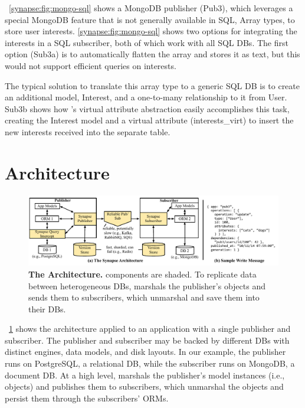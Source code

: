 \F~\ref{synapse:fig:mongo-sql} shows a MongoDB publisher (Pub3), which leverages a
special MongoDB feature that is not generally available in SQL,
Array types, to store user interests.  \F\ref{synapse:fig:mongo-sql} shows two options
for integrating the interests in a SQL subscriber, both of which work with all SQL DBs. 
The first option (Sub3a) is to automatically flatten the array and stores it as text, but this would not support efficient queries on interests.  

The typical solution to translate this array type to a generic SQL DB is to create an additional model, Interest, and a one-to-many relationship to it from User.
Sub3b shows how \synapse's virtual attribute abstraction easily accomplishes
this task, creating the Interest model and a virtual
attribute (interests\_virt) to insert the new interests
received into the separate table.



\section{\synapse Architecture}
\label{synapse:sec:arch}

\begin{figure}[t]
 \centering
 \includegraphics[width=.9\linewidth,clip=true,trim=0 0.20in 2.2in 0]{figures/synapse/architecture-less-detail.pdf}
 \caption{{{\bf The \synapse Architecture.} \synapse components are shaded.  To
             replicate data between heterogeneous DBs, \synapse marshals the publisher's
             objects and sends them to subscribers, which unmarshal and save them into their DBs.}}
 \label{synapse:fig:architecture}
\end{figure}
\F~\ref{synapse:fig:architecture} shows the \synapse architecture applied to an
application with a single publisher and subscriber. The publisher and subscriber
may be backed by different DBs with distinct engines, data models, and disk
layouts. In our example, the publisher runs on PostgreSQL, a relational DB,
while the subscriber runs on MongoDB, a document DB. At a high level, \synapse
marshals the publisher's model instances (i.e., objects) and publishes them to
subscribers, which unmarshal the objects and persist them through the
subscribers' ORMs.

